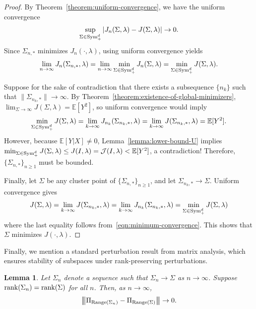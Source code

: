 \documentclass[sn-mathphys-num]{sn-jnl}%
\numberwithin{equation}{section}
\newcommand{\E}{\mathbb{E}}
\newcommand{\matrixnorm}[1]{\left|\!\left|\!\left|{#1}
  \right|\!\right|\!\right|} %
\newtheorem{lemma}{Lemma}
\newcommand{\Range}{{\rm Range}}
\newcommand{\rank}{{\rm rank}}
\newcommand{\Sym}{{\rm \mathrm{Sym}}}
\theoremstyle{thmstyleone}%
\theoremstyle{thmstyletwo}%
\theoremstyle{thmstylethree}%
\begin{document}
\vspace{.5em} 
\begin{proof} 
By Theorem~\ref{theorem:uniform-convergence}, we have the uniform convergence
\begin{equation*}
	\sup_{\Sigma \in \Sym_+^d} \left|J_n(\Sigma, \lambda) - J(\Sigma, \lambda)\right| \to 0.
\end{equation*} 
Since $\Sigma_{n,*}$ minimizes $J_{n}(\cdot,\lambda)$, using uniform convergence yields
\begin{equation}
\label{eqn:minimum-convergence}
	 \lim_{n \to \infty} J_{n}(\Sigma_{n,*}, \lambda) = 
	 	\lim_{n \to \infty} \min_{\Sigma \in \Sym_+^d} J_n(\Sigma, \lambda) =  \min_{\Sigma \in \Sym_+^d} J(\Sigma, \lambda).
\end{equation}

Suppose for the sake of contradiction that there exists a subsequence $\{n_k\}$ such that 
$\|\Sigma_{n_k,*}\| \to \infty$. By Theorem~\ref{theorem:existence-of-global-minimizers}, 
$\lim_{\Sigma \to \infty} J(\Sigma, \lambda) = \E[Y^2]$, so uniform convergence would imply 
\begin{equation*}
	\min_{\Sigma \in \Sym_+^d} J(\Sigma, \lambda)= \lim_{k \to \infty} J_{n_k}(\Sigma_{n_k,*}, \lambda) = 
		\lim_{k \to \infty} J(\Sigma_{n_k,*}, \lambda) = \E[Y^2].
\end{equation*}
However, because $\E[Y|X] \neq 0$, Lemma~\ref{lemma:lower-bound-U} implies $\min_{\Sigma \in \Sym_+^d} J(\Sigma, \lambda) \le J(I, \lambda) = \mathcal{J}(I,\lambda) < \E[Y^2]$, a contradiction! 
Therefore, $\{\Sigma_{n,*}\}_{n\ge 1}$ must be bounded.

Finally, let $\Sigma$ be any cluster point of $\{\Sigma_{n,*}\}_{n\ge 1}$, and let $\Sigma_{n_k,*} \to \Sigma$. 
Uniform convergence gives
\begin{equation*}
	J(\Sigma,\lambda) = \lim_{k \to \infty} J(\Sigma_{n_k, *}, \lambda) 
	= \lim_{k\to\infty} J_{n_k}(\Sigma_{n_k,*},\lambda)
	=  \min_{\Sigma \in \Sym_+^d} J(\Sigma, \lambda)
\end{equation*}
where the last equality follows from~\eqref{eqn:minimum-convergence}. 
This shows that $\Sigma$ minimizes $J(\cdot,\lambda)$.
\end{proof} 

Finally, we mention a standard perturbation result from matrix analysis, which ensures stability of subspaces under rank-preserving perturbations.

\vspace{.5em} 
\begin{lemma}
\label{lemma:standard-matrix-perturbation}
Let $\Sigma_n$ denote a sequence such that $\Sigma_n \to \Sigma$ as $n \to \infty$. 
Suppose $\rank(\Sigma_n) = \rank(\Sigma)$ for all $n$.  
Then, as $n \to \infty$, 
\begin{equation*}
	\matrixnorm{\proj_{\Range(\Sigma_n)} - \proj_{\Range(\Sigma)}} \to 0.
\end{equation*}
\end{lemma}
\end{document}
